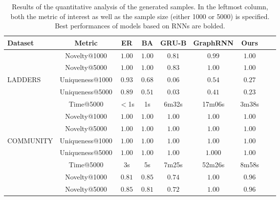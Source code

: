 \begin{table}[h!]
    \footnotesize
    \centering
    \caption{Results of the quantitative analysis of the generated samples. In the leftmost column, both the metric of interest as well as the sample size (either 1000 or 5000) is specified. Best performances of models based on RNNs are bolded.}
    \label{tab:graph-quantitative}
    \renewcommand{\arraystretch}{1.2}
    \begin{tabular}{lcccccccc}
        \toprule
         \textbf{Dataset} & \textbf{Metric} & \textbf{ER} & \textbf{BA} & \textbf{GRU-B} & \textbf{GraphRNN} & \textbf{Ours} \\
         \midrule
          & Novelty@1000              & $\mathbf{1.00}$ & $\mathbf{1.00}$ & $0.81$          & $0.99$          & $\mathbf{1.00}$\\
          & Novelty@5000              & $\mathbf{1.00}$ & $\mathbf{1.00}$ & $0.83$          & $\mathbf{1.00}$          & $\mathbf{1.00}$\\
          LADDERS & Uniqueness@1000   & $0.93$ & $0.68$ & $0.06$          & $\mathbf{0.54}$ & $0.27$\\
          & Uniqueness@5000           & $0.89$ & $0.51$ & $0.03$          & $\mathbf{0.41}$ & $0.23$\\
          & Time@5000                 & $<$1s    & 1s       & 6m32s             & 17m06s            & 3m38s\\
         \midrule
          & Novelty@1000              & $\mathbf{1.00}$ & $\mathbf{1.00}$ & $\mathbf{1.00}$ & $\mathbf{1.00}$ & $\mathbf{1.00}$\\
          & Novelty@5000              & $\mathbf{1.00}$ & $\mathbf{1.00}$ & $\mathbf{1.00}$ & $\mathbf{1.00}$ & $\mathbf{1.00}$\\
          COMMUNITY & Uniqueness@1000 & $\mathbf{1.00}$ & $\mathbf{1.00}$ & $\mathbf{1.00}$ & $\mathbf{1.00}$ & $\mathbf{1.00}$\\
          & Uniqueness@5000           & $\mathbf{1.00}$ & $\mathbf{1.00}$ & $\mathbf{1.00}$ & $\mathbf{1.000}$ & $\mathbf{1.00}$\\
          & Time@5000                 & 3s       & 5s       & 7m25s             & 52m26s            & 8m58s\\
         \midrule
          & Novelty@1000              & $0.81$ & $0.85$ & $0.74$          & $\mathbf{1.00}$ & $0.96$\\
          & Novelty@5000              & $0.85$ & $0.81$ & $0.72$          & $\mathbf{1.00}$ & $0.96$\\

\end{tabular}
\end{table}
